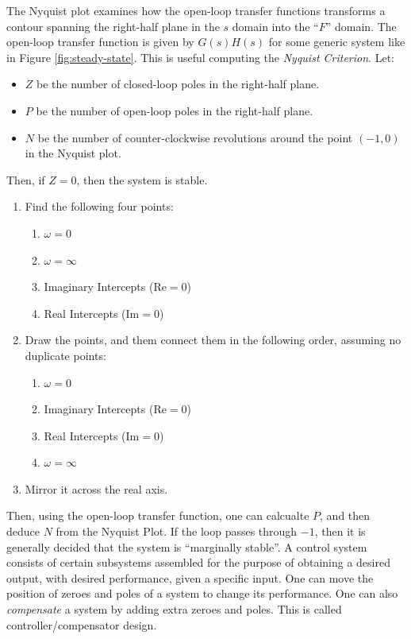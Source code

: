 \documentclass{article}
\begin{document}
The Nyquist plot examines how the open-loop transfer functions transforms a contour spanning the right-half plane in the $s$ domain into the ``$F$'' domain. The open-loop transfer function is given by $G(s)H(s)$ for some generic system like in Figure \ref{fig:steady-state}. This is useful computing the \textit{Nyquist Criterion}.
\gap
{} Let:
\begin{itemize}
\item $Z$ be the number of closed-loop poles in the right-half plane.
\item $P$ be the number of open-loop poles in the right-half plane.
\item $N$ be the number of counter-clockwise revolutions around the point $(-1, 0)$ in the Nyquist plot.
\end{itemize}
Then, if $Z = 0$, then the system is stable.
\gap
{}
\begin{enumerate}
\item Find the following four points:
  \begin{enumerate}
  \item $\omega = 0$
  \item $\omega = \infty$
  \item Imaginary Intercepts ($\text{Re} = 0$)
  \item Real Intercepts ($\text{Im} = 0$)
  \end{enumerate}
\item Draw the points, and them connect them in the following order, assuming no duplicate
  points:
  \begin{enumerate}
  \item $\omega = 0$
  \item Imaginary Intercepts ($\text{Re} = 0$)
  \item Real Intercepts ($\text{Im} = 0$)
  \item $\omega = \infty$
  \end{enumerate}
\item Mirror it across the real axis.
\end{enumerate}
Then, using the open-loop transfer function, one can calcualte $P$, and then deduce $N$ from the Nyquist Plot. If the loop passes through $-1$, then it is generally decided that the system is ``marginally stable''.
\gap
{}
A control system consists of certain subsystems assembled for the purpose of obtaining a desired output, with desired performance, given a specific input. One can move the position of zeroes and poles of a system to change its performance. One can also \textit{compensate} a system by adding extra zeroes and poles. This is called controller/compensator design.
\end{document}
